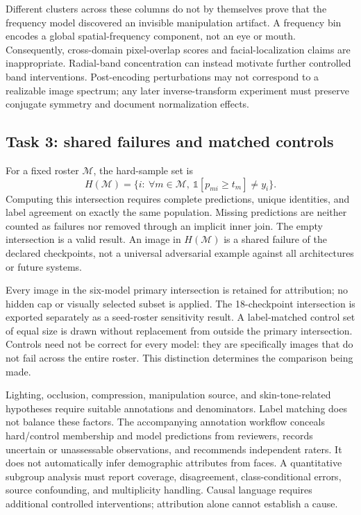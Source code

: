 \documentclass{article}
\newcommand{\ind}{\mathbb{1}}
\begin{document}
Different clusters across these columns do not by themselves prove that the frequency model discovered an invisible manipulation artifact. A frequency bin encodes a global spatial-frequency component, not an eye or mouth. Consequently, cross-domain pixel-overlap scores and facial-localization claims are inappropriate. Radial-band concentration can instead motivate further controlled band interventions. Post-encoding perturbations may not correspond to a realizable image spectrum; any later inverse-transform experiment must preserve conjugate symmetry and document normalization effects.

\subsection{Task 3: shared failures and matched controls}
For a fixed roster $\mathcal M$, the hard-sample set is
\begin{equation}
 H(\mathcal M)=\{i:\ \forall m\in\mathcal M,\ \ind[p_{mi}\geq t_m]\neq y_i\}.
\end{equation}
Computing this intersection requires complete predictions, unique identities, and label agreement on exactly the same population. Missing predictions are neither counted as failures nor removed through an implicit inner join. The empty intersection is a valid result. An image in $H(\mathcal M)$ is a shared failure of the declared checkpoints, not a universal adversarial example against all architectures or future systems.

Every image in the six-model primary intersection is retained for attribution; no hidden cap or visually selected subset is applied. The 18-checkpoint intersection is exported separately as a seed-roster sensitivity result. A label-matched control set of equal size is drawn without replacement from outside the primary intersection. Controls need not be correct for every model: they are specifically images that do not fail across the entire roster. This distinction determines the comparison being made.

Lighting, occlusion, compression, manipulation source, and skin-tone-related hypotheses require suitable annotations and denominators. Label matching does not balance these factors. The accompanying annotation workflow conceals hard/control membership and model predictions from reviewers, records uncertain or unassessable observations, and recommends independent raters. It does not automatically infer demographic attributes from faces. A quantitative subgroup analysis must report coverage, disagreement, class-conditional errors, source confounding, and multiplicity handling. Causal language requires additional controlled interventions; attribution alone cannot establish a cause.
\end{document}
